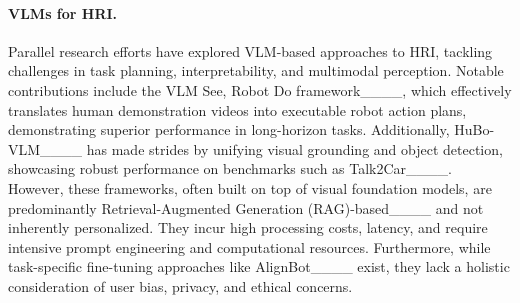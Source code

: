 \paragraph{VLMs for HRI.} Parallel research efforts have explored VLM-based approaches to HRI, tackling challenges in task planning, interpretability, and multimodal perception. Notable contributions include the VLM See, Robot Do framework____, which effectively translates human demonstration videos into executable robot action plans, demonstrating superior performance in long-horizon tasks. Additionally, HuBo-VLM____ has made strides by unifying visual grounding and object detection, showcasing robust performance on benchmarks such as Talk2Car____. However, these frameworks, often built on top of visual foundation models, are predominantly Retrieval-Augmented Generation (RAG)-based____ and not inherently personalized. They incur high processing costs, latency, and require intensive prompt engineering and computational resources. Furthermore, while task-specific fine-tuning approaches like AlignBot____ exist, they lack a holistic consideration of user bias, privacy, and ethical concerns.